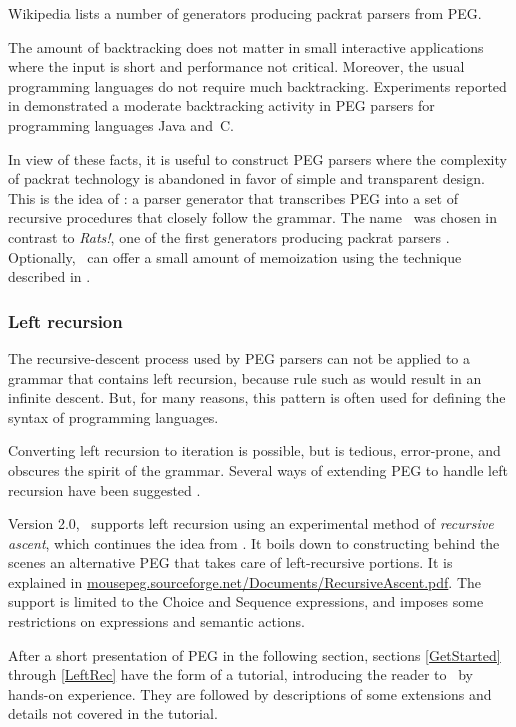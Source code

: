 Wikipedia \cite{Wiki:Rats} lists a number of generators  
producing packrat parsers from PEG.

The amount of backtracking does not matter 
in small interactive applications
where the input is short and performance not critical.
Moreover, the usual programming languages
do not require much backtracking.
%
Experiments reported in \cite{Redz:2007:FI,Redz:2008:FI}
demonstrated a moderate backtracking activity  
in PEG parsers for programming languages Java and~C.

\newpage
In view of these facts,
it is useful to construct PEG parsers
where the complexity of packrat technology is abandoned in favor
of simple and transparent design.
This is the idea of \Mouse:
a parser generator that transcribes
PEG into a set of recursive procedures that closely follow the grammar.
The name \Mouse\ was chosen in contrast to \textsl{Rats!}, 
one of the first generators producing packrat parsers \cite{Grimm:2004}.
Optionally, \Mouse\ can offer a small amount of memoization using the technique
described in \cite{Redz:2007:FI}.

\subsubsection*{Left recursion}

The recursive-descent process used by PEG parsers can not be applied to a grammar
that contains left recursion, because rule such as 
would result in an infinite descent.
But, for many reasons, this pattern is often used for defining the syntax
of programming languages.

Converting left recursion to iteration is possible, but is tedious, error-prone, 
and obscures the spirit of the grammar. 
Several ways of extending PEG to handle left recursion have been suggested 
\cite{Orlando:2010,Warth:2008,Tratt:2010,Medeiros:2014:LR}.

Version 2.0, \Mouse\ supports left recursion
using an experimental method of \emph{recursive ascent},
which continues the idea from \cite{Orlando:2010}.
It boils down to constructing behind the scenes an alternative PEG
that takes care of left-recursive portions.
It is explained in \url{mousepeg.sourceforge.net/Documents/RecursiveAscent.pdf}.
The support is limited to the Choice and Sequence expressions,
and imposes some restrictions on expressions and semantic actions. 

\bigskip
After a short presentation of PEG in the following section,
sections \ref{GetStarted} through \ref{LeftRec}
have the form of a tutorial,
introducing the reader to \Mouse\ by hands-on experience.
They are followed by descriptions of some extensions
and details not covered in the tutorial.
